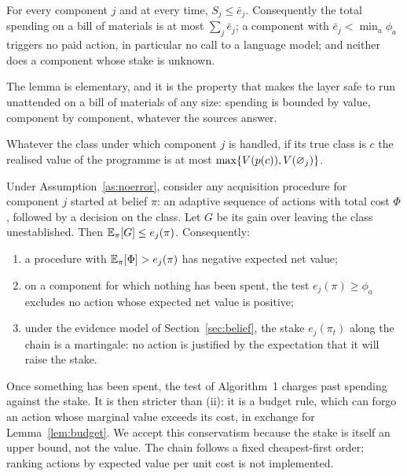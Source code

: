 \begin{lemma}\label{lem:budget}
For every component $j$ and at every time, $S_j\le\bar e_j$. Consequently the total spending on a bill of materials
is at most $\sum_j\bar e_j$; a component with $\bar e_j<\min_a\phi_a$ triggers no paid action, in particular no call
to a language model; and neither does a component whose stake is unknown.
\end{lemma}

The lemma is elementary, and it is the property that makes the layer safe to run unattended on a bill of materials
of any size: spending is bounded by value, component by component, whatever the sources answer.

\begin{assumption}\label{as:noerror}
Whatever the class under which component $j$ is handled, if its true class is $c$ the realised value of the
programme is at most $\max\{V(p(c)),V(\varnothing_j)\}$.
\end{assumption}

\begin{proposition}\label{prop:screen}
Under Assumption~\ref{as:noerror}, consider any acquisition procedure for component $j$ started at belief $\pi$: an
adaptive sequence of actions with total cost $\Phi$, followed by a decision on the class. Let $G$ be its gain over
leaving the class unestablished. Then $\mathbb{E}_\pi[G]\le e_j(\pi)$. Consequently:
\begin{enumerate}\setlength{\itemsep}{0pt}
\item[(i)] a procedure with $\mathbb{E}_\pi[\Phi]>e_j(\pi)$ has negative expected net value;
\item[(ii)] on a component for which nothing has been spent, the test $e_j(\pi)\ge\phi_a$ excludes no action whose
  expected net value is positive;
\item[(iii)] under the evidence model of Section~\ref{sec:belief}, the stake $e_j(\pi_t)$ along the chain is a
  martingale: no action is justified by the expectation that it will raise the stake.
\end{enumerate}
\end{proposition}

Once something has been spent, the test of Algorithm~1 charges past spending against the stake. It is then stricter
than (ii): it is a budget rule, which can forgo an action whose marginal value exceeds its cost, in exchange for
Lemma~\ref{lem:budget}. We accept this conservatism because the stake is itself an upper bound, not the value. The
chain follows a fixed cheapest-first order; ranking actions by expected value per unit cost is not implemented.

